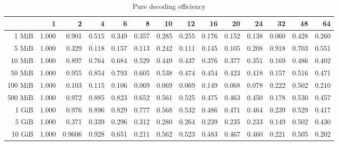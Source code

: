 \begin{table}[!h]
	\centering
	\caption{Pure decoding efficiency}
	\begin{tabular}{rrrrrrrrrrrrrr}
		\toprule
		\diagbox[width=7em]{Sizes}{Threads} & 1  &    2  &    4  &    6  &    8  &    10 &    12 &    16 &    20 &    24 &    32 &    48 &    64 \\
		\midrule
		1 MiB   & 1.000 & 0.901 & 0.515 & 0.349 & 0.357 & 0.285 & 0.255 & 0.176 & 0.152 & 0.138 & 0.060 & 0.428 & 0.260 \\
		5 MiB   & 1.000 & 0.329 & 0.118 & 0.157 & 0.113 & 0.242 & 0.111 & 0.145 & 0.105 & 0.208 & 0.918 & 0.703 & 0.551 \\
		10 MiB  & 1.000 & 0.897 & 0.764 & 0.684 & 0.529 & 0.449 & 0.437 & 0.376 & 0.377 & 0.351 & 0.169 & 0.486 & 0.402 \\
		50 MiB  & 1.000 & 0.955 & 0.854 & 0.793 & 0.605 & 0.538 & 0.474 & 0.454 & 0.423 & 0.418 & 0.157 & 0.516 & 0.471 \\
		100 MiB & 1.000 & 0.103 & 0.115 & 0.106 & 0.069 & 0.069 & 0.069 & 0.149 & 0.068 & 0.078 & 0.222 & 0.502 & 0.210 \\
		500 MiB & 1.000 & 0.972 & 0.885 & 0.823 & 0.652 & 0.561 & 0.525 & 0.475 & 0.463 & 0.450 & 0.178 & 0.530 & 0.457 \\
		1 GiB   & 1.000 & 0.976 & 0.896 & 0.829 & 0.777 & 0.568 & 0.532 & 0.486 & 0.471 & 0.464 & 0.239 & 0.529 & 0.417 \\
		5 GiB   & 1.000 & 0.371 & 0.339 & 0.296 & 0.312 & 0.280 & 0.264 & 0.239 & 0.235 & 0.233 & 0.149 & 0.502 & 0.430 \\
		10 GiB  & 1.000 & 0.9606 & 0.928 & 0.651 & 0.211 & 0.562 & 0.523 & 0.483 & 0.467 & 0.460 & 0.221 & 0.505 & 0.202 \\
		\bottomrule
	\end{tabular}
\end{table}
